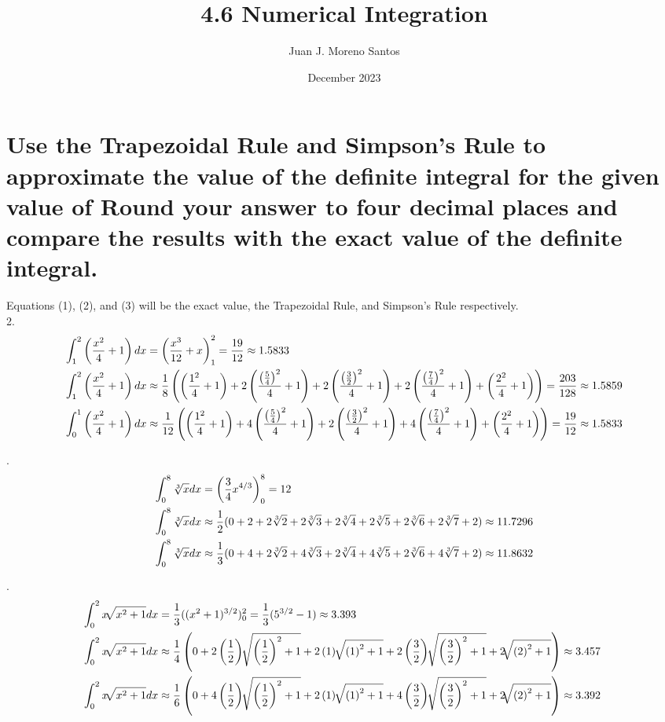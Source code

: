 \documentclass[11pt]{article}
\newcommand*{\vs}{\vspace{1cm}}
\newcommand*{\next}{\noindent}
\newcommand*{\set}{\setcounter{equation}{0}}
\newcommand*{\lt}{\left}
\newcommand*{\rt}{\right}
\begin{document}
\title{4.6 Numerical Integration}
\author{Juan J. Moreno Santos}
\date{December 2023}

\maketitle
\section{Use the Trapezoidal Rule and Simpson’s Rule
to approximate the value of the definite integral for the given
value of Round your answer to four decimal places and
compare the results with the exact value of the definite integral.}
Equations (1), (2), and (3) will be the exact value, the Trapezoidal Rule, and Simpson's Rule respectively.\\
2.\begin{align}
    \set
    \int_{1}^{2}\lt(\frac{x^2}{4}+1\rt)dx&=\lt(\frac{x^3}{12}+x\rt)_1^2=\frac{19}{12}\approx 1.5833\\
    \int_{1}^{2}\lt(\frac{x^2}{4}+1\rt)dx&\approx\frac{1}{8}\lt(\lt(\frac{1^2}{4}+1\rt)+2\lt(\frac{\lt(\frac{5}{4}\rt)^2}{4}+1\rt)+2\lt(\frac{\lt(\frac{3}{2}\rt)^2}{4}+1\rt)+2\lt(\frac{\lt(\frac{7}{4}\rt)^2}{4}+1\rt)+\lt(\frac{2^2}{4}+1\rt)\rt)=\frac{203}{128}\approx 1.5859\\
    \int_{0}^{1}\lt(\frac{x^2}{4}+1\rt)dx&\approx\frac{1}{12}\lt(\lt(\frac{1^2}{4}+1\rt)+4\lt(\frac{\lt(\frac{5}{4}\rt)^2}{4}+1\rt)+2\lt(\frac{\lt(\frac{3}{2}\rt)^2}{4}+1\rt)+4\lt(\frac{\lt(\frac{7}{4}\rt)^2}{4}+1\rt)+\lt(\frac{2^2}{4}+1\rt)\rt)=\frac{19}{12}\approx 1.5833
\end{align}

\vs\next
6.\begin{align}
    \set
    \int_{0}^{8}\sqrt[3]{x}dx&=\lt(\frac{3}{4}x^{4/3}\rt)_0^8=12\\
    \int_{0}^{8}\sqrt[3]{x}dx&\approx\frac{1}{2}(0+2+2\sqrt[3]{2}+2\sqrt[3]{3}+2\sqrt[3]{4}+2\sqrt[3]{5}+2\sqrt[3]{6}+2\sqrt[3]{7}+2)\approx 11.7296\\
    \int_{0}^{8}\sqrt[3]{x}dx&\approx\frac{1}{3}(0+4+2\sqrt[3]{2}+4\sqrt[3]{3}+2\sqrt[3]{4}+4\sqrt[3]{5}+2\sqrt[3]{6}+4\sqrt[3]{7}+2)\approx 11.8632
\end{align}

\vs\next
10.\begin{align}
    \set
    \int_{0}^{2}x\sqrt[]{x^2+1}dx&=\frac{1}{3}((x^2+1)^{3/2})_0^2=\frac{1}{3}(5^{3/2}-1)\approx 3.393\\
    \int_{0}^{2}x\sqrt[]{x^2+1}dx&\approx\frac{1}{4}\lt(0+2\lt(\frac{1}{2}\rt)\sqrt[]{\lt(\frac{1}{2}\rt)^2+1}+2\lt(1\rt)\sqrt[]{\lt(1\rt)^2+1}+2\lt(\frac{3}{2}\rt)\sqrt[]{\lt(\frac{3}{2}\rt)^2+1}+2\sqrt[]{\lt(2\rt)^2+1}\rt)\approx 3.457\\
    \int_{0}^{2}x\sqrt[]{x^2+1}dx&\approx\frac{1}{6}\lt(0+4\lt(\frac{1}{2}\rt)\sqrt[]{\lt(\frac{1}{2}\rt)^2+1}+2\lt(1\rt)\sqrt[]{\lt(1\rt)^2+1}+4\lt(\frac{3}{2}\rt)\sqrt[]{\lt(\frac{3}{2}\rt)^2+1}+2\sqrt[]{\lt(2\rt)^2+1}\rt)\approx 3.392\
\end{align}
\end{document}
